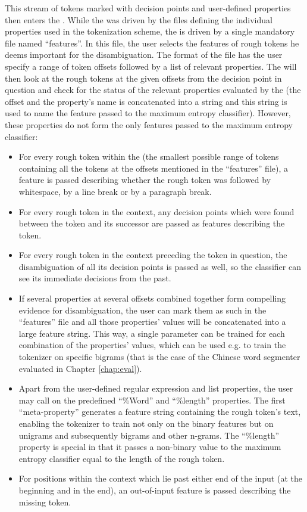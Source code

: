 This stream of tokens marked with decision points and user-defined properties
then enters the . While the  was
driven by the files defining the individual properties used in the tokenization
scheme, the  is driven by a single mandatory file named
``features''. In this file, the user selects the features of rough tokens he
deems important for the disambiguation. The format of the file has the user
specify a range of token offsets followed by a list of relevant properties.
The  will then look at the rough tokens at the given offsets
from the decision point in question and check for the status of the relevant
properties evaluated by the  (the offset and the
property's name is concatenated into a string and this string is used to name
the feature passed to the maximum entropy classifier). However, these properties
do not form the only features passed to the maximum entropy classifier:
\begin{itemize}
  \item For every rough token within the  (the smallest
  possible range of tokens containing all the tokens at the offsets mentioned
  in the ``features'' file), a feature is passed describing whether the rough
  token was followed by whitespace, by a line break or by a paragraph break.
  \item For every rough token in the context, any decision points which were
  found between the token and its successor are passed as features describing
  the token.
  \item For every rough token in the context preceding the token in question,
  the disambiguation of all its decision points is passed as well, so the
  classifier can see its immediate decisions from the past.
  \item If several properties at several offsets combined together form
  compelling evidence for disambiguation, the user can mark them as such in the
  ``features'' file and all those properties' values will be concatenated into
  a large feature string. This way, a single parameter can be trained for each
  combination of the properties' values, which can be used e.g. to train the
  tokenizer on specific bigrams (that is the case of the Chinese word segmenter
  evaluated in Chapter \ref{chap:eval}).
  \item Apart from the user-defined regular expression and list properties, the
  user may call on the predefined ``\%Word'' and ``\%length'' properties. The
  first ``meta-property'' generates a feature string containing the rough
  token's text, enabling the tokenizer to train not only on the binary features
  but on unigrams and subsequently bigrams and other n-grams. The ``\%length''
  property is special in that it passes a non-binary value to the maximum
  entropy classifier equal to the length of the rough token.
  \item For positions within the context which lie past either end of the input
  (at the beginning and in the end), an out-of-input feature is passed
  describing the missing token.
\end{itemize}

